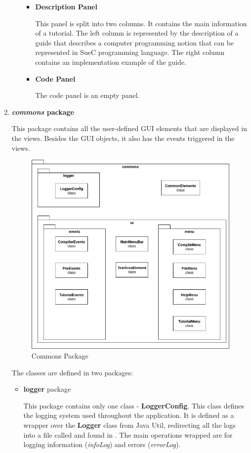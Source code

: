 \documentclass[12pt,a4paper,twoside]{report}
\begin{document}
\begin{enumerate}
\begin{enumerate}
\begin{itemize}
 \item \textbf{Description Panel}
 
 This panel is split into two columns. It contains the main information of a tutorial. The left column is represented by the description of a guide that describes a computer programming notion that can be represented in SueC programming language. The right column contains an implementation example of the guide.
 
 \item \textbf{Code Panel}
 
 The code panel is an empty panel.  
 \end{itemize}


\end{enumerate}



\item \textbf{\textit{commons} package}

This package contains all the user-defined GUI elements that are displayed in the views. Besides the GUI objects, it also has the events triggered in the views. 

\begin{figure}[H]
    \centering
    \includegraphics[width=0.8\linewidth]{img/CommonsPackage.png}
    \caption{Commons Package}
    \label{fig:conf}
\end{figure}

The classes are defined in two packages: 
\begin{itemize}
 \item \textbf{logger} package 
 
 This package contains only one class - \textbf{LoggerConfig}. This class defines the logging system used throughout the application. It is defined as a wrapper over the \textbf{Logger} class from Java Util, redirecting all the logs into a file called and found in . The main operations wrapped are for logging information (\textit{infoLog}) and errors (\textit{errorLog}).
 
\end{itemize}


\end{enumerate}
\end{document}
